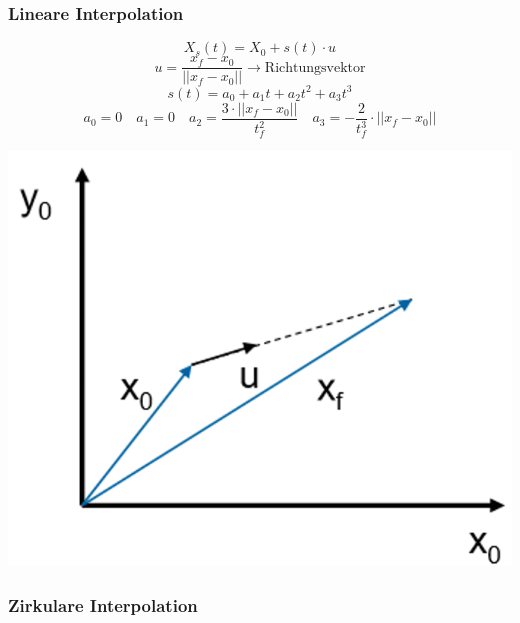 \begin{minipage}{0.7\linewidth}
    \subsubsection{Lineare Interpolation }
    \vspace{-0.8cm}
    \[ X_s(t) = X_0 + s(t) \cdot u \]
    \[ u= \frac{x_f - x_0}{||x_f -x_0||} \rightarrow \text{Richtungsvektor}\]
    \[ s(t)=a_0 + a_1 t + a_2 t^2 +a_3t^3 \]
    \[ a_0=0 \quad a_1=0 \quad a_2=\frac{3\cdot ||x_f-x_0||}{t_f^2} \quad a_3=-\frac{2}{t_f^3}\cdot ||x_f-x_0||  \]
\end{minipage}
\begin{minipage}{0.3\linewidth}
    \includegraphics[width=0.9\linewidth]{./bilder/LinInter}
\end{minipage}

\subsubsection{Zirkulare Interpolation }
\clearpage

